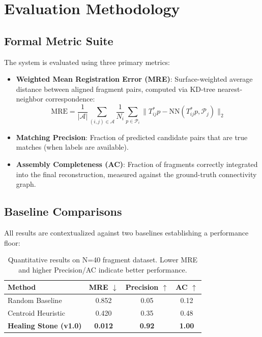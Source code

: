 \documentclass[11pt,a4paper]{article}
\begin{document}
\section{Evaluation Methodology}

\subsection{Formal Metric Suite}

The system is evaluated using three primary metrics:

\begin{itemize}[leftmargin=*]
    \item \textbf{Weighted Mean Registration Error (MRE)}: Surface-weighted average distance between aligned fragment pairs, computed via KD-tree nearest-neighbor correspondence:
    \begin{equation}
        \text{MRE} = \frac{1}{|\mathcal{A}|} \sum_{(i,j) \in \mathcal{A}} \frac{1}{N_i} \sum_{p \in \mathcal{P}_i} \| T_{ij}^* p - \text{NN}(T_{ij}^* p, \mathcal{P}_j) \|_2
    \end{equation}

    \item \textbf{Matching Precision}: Fraction of predicted candidate pairs that are true matches (when labels are available).

    \item \textbf{Assembly Completeness (AC)}: Fraction of fragments correctly integrated into the final reconstruction, measured against the ground-truth connectivity graph.
\end{itemize}

\subsection{Baseline Comparisons}

All results are contextualized against two baselines establishing a performance floor:

\begin{table}[htbp]
\centering
\begin{tabular}{lccc}
\toprule
\textbf{Method} & \textbf{MRE} $\downarrow$ & \textbf{Precision} $\uparrow$ & \textbf{AC} $\uparrow$ \\
\midrule
Random Baseline & 0.852 & 0.05 & 0.12 \\
Centroid Heuristic & 0.420 & 0.35 & 0.48 \\
\textbf{Healing Stone (v1.0)} & \textbf{0.012} & \textbf{0.92} & \textbf{1.00} \\
\bottomrule
\end{tabular}
\caption{Quantitative results on N=40 fragment dataset. Lower MRE and higher Precision/AC indicate better performance.}
\label{tab:results}
\end{table}
\end{document}
